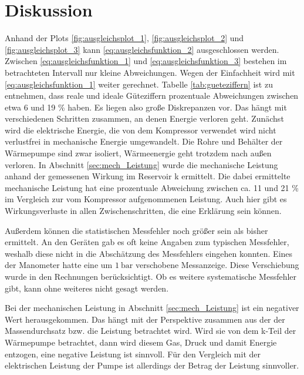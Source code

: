 \section{Diskussion}
Anhand der Plots \ref{fig:ausgleichsplot_1}, \ref{fig:ausgleichsplot_2} und \ref{fig:ausgleichsplot_3}
kann \eqref{eq:ausgleichsfunktion_2} ausgeschlossen werden. 
Zwischen \eqref{eq:ausgleichsfunktion_1} und \eqref{eq:ausgleichsfunktion_3} bestehen im betrachteten Intervall nur kleine Abweichungen.
Wegen der Einfachheit wird mit \eqref{eq:ausgleichsfunktion_1} weiter gerechnet.
Tabelle \ref{tab:gueteziffern} ist zu entnehmen, dass reale und ideale Güteziffern prozentuale Abweichungen zwischen etwa
6 und 19 \% haben.
Es liegen also große Diskrepanzen vor.
Das hängt mit verschiedenen Schritten zusammen, an denen Energie verloren geht.
Zunächst wird die elektrische Energie, die von dem Kompressor verwendet wird
nicht verlustfrei in mechanische Energie umgewandelt.
Die Rohre und Behälter der Wärmepumpe sind zwar isoliert, 
Wärmeenergie geht trotzdem nach außen verloren.
In Abschnitt \ref{sec:mech_Leistung} wurde die mechanische Leistung anhand der gemessenen Wirkung im Reservoir k ermittelt.
Die dabei ermittelte mechanische Leistung hat eine prozentuale Abweichung zwischen ca. 11 und 21 \% im Vergleich zur
vom Kompressor aufgenommenen Leistung.
Auch hier gibt es Wirkungsverluste in allen Zwischenschritten, die eine Erklärung sein können.

\noindent
Außerdem können die statistischen Messfehler noch größer sein als bisher ermittelt.
An den Geräten gab es oft keine Angaben zum typischen Messfehler,
weshalb diese nicht in die Abschätzung des Messfehlers eingehen konnten.
Eines der Manometer hatte eine um $\qty{1}{\bar}$ verschobene Messanzeige.
Diese Verschiebung wurde in den Rechnungen berücksichtigt.
Ob es weitere systematische Messfehler gibt, kann ohne weiteres nicht gesagt werden.

\noindent
Bei der mechanischen Leistung in Abschnitt \ref{sec:mech_Leistung} ist ein negativer Wert herausgekommen. 
Das hängt mit der Perspektive zusammen aus der der Massendurchsatz bzw. die Leistung betrachtet wird.
Wird sie von dem k-Teil der Wärmepumpe betrachtet, dann wird diesem Gas, Druck und damit Energie entzogen,
eine negative Leistung ist sinnvoll.
Für den Vergleich mit der elektrischen Leistung der Pumpe ist allerdings der Betrag der Leistung sinnvoller.